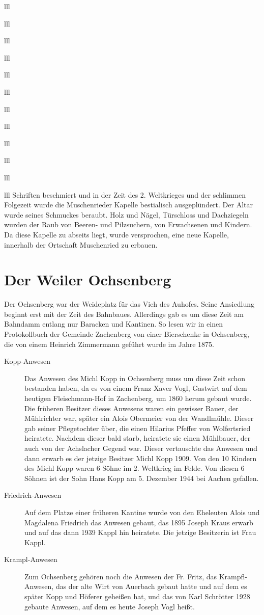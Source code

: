 \documentclass[12pt,a4pager]{book}
\begin{document}
\begin{tabuluar}{lll}
\begin{tabuluar}{lll}
\begin{tabuluar}{lll}
\begin{tabuluar}{lll}
\begin{tabuluar}{lll}
\begin{tabuluar}{lll}
\begin{tabuluar}{lll}
\begin{tabuluar}{lll}
\begin{tabuluar}{lll}
\begin{tabuluar}{lll}
\begin{tabuluar}{lll}
\begin{tabuluar}{lll}
Schriften beschmiert und in der Zeit des 2. Weltkrieges und der schlimmen
Folgezeit wurde die Muschenrieder Kapelle bestialisch ausgeplündert. Der Altar
wurde seines Schmuckes beraubt. Holz und Nägel, Türschloss und Dachziegeln
wurden der Raub von Beeren- und Pilzsuchern, von Erwachsenen und Kindern. Da
diese Kapelle zu abseits liegt, wurde versprochen, eine neue Kapelle, innerhalb
der Ortschaft Muschenried zu erbauen.

\section{Der Weiler Ochsenberg}

Der Ochsenberg war der Weideplatz für das Vieh des Auhofes. Seine Ansiedlung
beginnt erst mit der Zeit des Bahnbaues. Allerdings gab es um diese Zeit am
Bahndamm entlang nur Baracken und Kantinen. So lesen wir in einen Protokollbuch
der Gemeinde Zachenberg von einer Bierschenke in Ochsenberg, die von einem
Heinrich Zimmermann geführt wurde im Jahre 1875.

\begin{description}
\item[Kopp-Anwesen] Das Anwesen des Michl Kopp in Ochsenberg muss um diese Zeit
schon bestanden haben, da es von einem Franz Xaver Vogl, Gastwirt auf dem
heutigen Fleischmann-Hof in Zachenberg, um 1860 herum gebaut wurde. Die früheren
Besitzer dieses Anwesens waren ein gewisser Bauer, der Mühlrichter war, später
ein Alois Obermeier von der Wandlmühle. Dieser gab seiner Pflegetochter über,
die einen Hilarius Pfeffer von Wolfertsried heiratete. Nachdem dieser bald
starb, heiratete sie einen Mühlbauer, der auch von der Achslacher Gegend war.
Dieser vertauschte das Anwesen und dann erwarb es der jetzige Besitzer Michl
Kopp 1909. Von den 10 Kindern des Michl Kopp waren 6 Söhne im 2. Weltkrieg im
Felde. Von diesen 6 Söhnen ist der Sohn Hans Kopp am 5. Dezember 1944 bei Aachen
gefallen.

\item[Friedrich-Anwesen] Auf dem Platze einer früheren Kantine wurde von den
Eheleuten Alois und Magdalena Friedrich das Anwesen gebaut, das 1895 Joseph
Kraus erwarb und auf das dann 1939 Kappl hin heiratete. Die jetzige Besitzerin
ist Frau Kappl.

\item[Krampl-Anwesen] Zum Ochsenberg gehören noch die Anwesen der Fr. Fritz, das
Krampfl-Anwesen, das der alte Wirt von Auerbach gebaut hatte und auf dem es
später Kopp und Höferer geheißen hat, und das von Karl Schrötter 1928 gebaute
Anwesen, auf dem es heute Joseph Vogl heißt.


\end{description}
\end{tabuluar}
\end{tabuluar}
\end{tabuluar}
\end{tabuluar}
\end{tabuluar}
\end{tabuluar}
\end{tabuluar}
\end{tabuluar}
\end{tabuluar}
\end{tabuluar}
\end{tabuluar}
\end{tabuluar}
\end{document}

